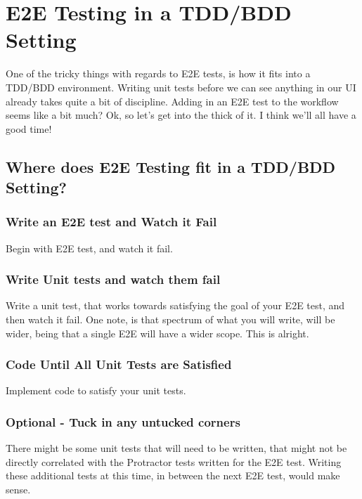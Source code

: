\maketitle{}
\section{ E2E Testing in a TDD/BDD Setting }

One of the tricky things with regards to E2E tests, is how it fits into a
TDD/BDD environment. Writing unit tests before we can see anything in our UI
already takes quite a bit of discipline. Adding in an E2E test to the workflow
seems like a bit much? Ok, so let's get into the thick of it. I think we'll all
have a good time!

\subsection{ Where does E2E Testing fit in a TDD/BDD Setting? }

\subsubsection{ Write an E2E test and Watch it Fail }
Begin with E2E test, and watch it fail.

\subsubsection{ Write Unit tests and watch them fail }
Write a unit test, that works towards satisfying the goal of your E2E test, and
then watch it fail. One note, is that spectrum of what you will write, will
be wider, being that a single E2E will have a wider scope. This is alright.

\subsubsection{ Code Until All Unit Tests are Satisfied }
Implement code to satisfy your unit tests.

\subsubsection{ Optional - Tuck in any untucked corners }
There might be some unit tests that will need to be written, that might not be
directly correlated with the Protractor tests written for the E2E test. Writing
these additional tests at this time, in between the next E2E test, would make
sense.

